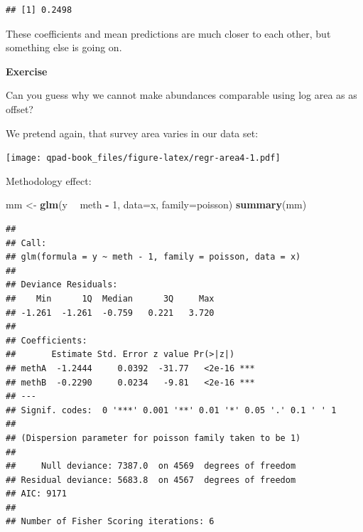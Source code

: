 \documentclass[12pt,]{book}
\newenvironment{Shaded}{\begin{snugshade}}{\end{snugshade}}
\newcommand{\DataTypeTok}[1]{\textcolor[rgb]{0.13,0.29,0.53}{#1}}
\newcommand{\DecValTok}[1]{\textcolor[rgb]{0.00,0.00,0.81}{#1}}
\newcommand{\KeywordTok}[1]{\textcolor[rgb]{0.13,0.29,0.53}{\textbf{#1}}}
\newcommand{\NormalTok}[1]{#1}
\newcommand{\OperatorTok}[1]{\textcolor[rgb]{0.81,0.36,0.00}{\textbf{#1}}}
\newcommand{\OtherTok}[1]{\textcolor[rgb]{0.56,0.35,0.01}{#1}}
\newcommand{\StringTok}[1]{\textcolor[rgb]{0.31,0.60,0.02}{#1}}
\let\BeginKnitrBlock\begin \let\EndKnitrBlock\end
\begin{document}
\begin{verbatim}
## [1] 0.2498
\end{verbatim}

These coefficients and mean predictions are much closer to each other,
but something else is going on.

\BeginKnitrBlock{rmdexercise}
\textbf{Exercise}

Can you guess why we cannot make abundances comparable using
log area as as offset?
\EndKnitrBlock{rmdexercise}

We pretend again, that survey area varies in our data set:

\begin{Shaded}
\end{Shaded}

\texttt{[image: qpad-book\_files/figure-latex/regr-area4-1.pdf]}

Methodology effect:

\begin{Shaded}
\begin{Highlighting}[]
\NormalTok{mm <-}\StringTok{ }\KeywordTok{glm}\NormalTok{(y }\OperatorTok{~}\StringTok{ }\NormalTok{meth }\OperatorTok{-}\StringTok{ }\DecValTok{1}\NormalTok{, }\DataTypeTok{data=}\NormalTok{x, }\DataTypeTok{family=}\NormalTok{poisson)}
\KeywordTok{summary}\NormalTok{(mm)}
\end{Highlighting}
\end{Shaded}

\begin{verbatim}
## 
## Call:
## glm(formula = y ~ meth - 1, family = poisson, data = x)
## 
## Deviance Residuals: 
##    Min      1Q  Median      3Q     Max  
## -1.261  -1.261  -0.759   0.221   3.720  
## 
## Coefficients:
##       Estimate Std. Error z value Pr(>|z|)    
## methA  -1.2444     0.0392  -31.77   <2e-16 ***
## methB  -0.2290     0.0234   -9.81   <2e-16 ***
## ---
## Signif. codes:  0 '***' 0.001 '**' 0.01 '*' 0.05 '.' 0.1 ' ' 1
## 
## (Dispersion parameter for poisson family taken to be 1)
## 
##     Null deviance: 7387.0  on 4569  degrees of freedom
## Residual deviance: 5683.8  on 4567  degrees of freedom
## AIC: 9171
## 
## Number of Fisher Scoring iterations: 6
\end{verbatim}
\end{document}
